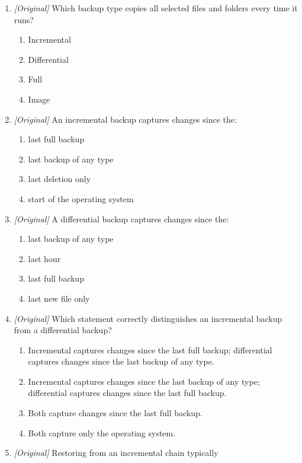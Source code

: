 \begin{enumerate}[label=\textbf{Q\arabic*.}, leftmargin=*]
\item \textit{[Original]} Which backup type copies all selected files and
  folders every time it runs?
  \begin{enumerate}[label=\Alph*.]
    \item Incremental
    \item Differential
    \item Full
    \item Image
  \end{enumerate}
\item \textit{[Original]} An incremental backup captures changes since the:
  \begin{enumerate}[label=\Alph*.]
    \item last full backup
    \item last backup of any type
    \item last deletion only
    \item start of the operating system
  \end{enumerate}
\item \textit{[Original]} A differential backup captures changes since the:
  \begin{enumerate}[label=\Alph*.]
    \item last backup of any type
    \item last hour
    \item last full backup
    \item last new file only
  \end{enumerate}
\item \textit{[Original]} Which statement correctly distinguishes an
  incremental backup from a differential backup?
  \begin{enumerate}[label=\Alph*.]
    \item Incremental captures changes since the last full backup;
      differential captures changes since the last backup of any type.
    \item Incremental captures changes since the last backup of any type;
      differential captures changes since the last full backup.
    \item Both capture changes since the last full backup.
    \item Both capture only the operating system.
  \end{enumerate}
\item \textit{[Original]} Restoring from an incremental chain typically

\end{enumerate}
